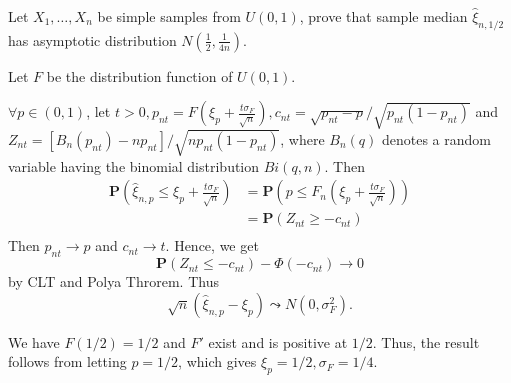 \begin{problem}
    Let $ X_1,\ldots,X_n $ be simple samples from $U(0,1)$, prove that sample median $\hat\xi_{n,1/2}$ has asymptotic distribution $N(\frac12,\frac{1}{4n})$.
\end{problem}
\begin{solution}
    Let $F$ be the distribution function of $U(0,1)$. 

    $\forall p\in (0,1)$, let $t>0, p_{nt} = F(\xi_{p} + \frac{t\sigma_F}{\sqrt{n}}), c_{nt} = \sqrt{p_{nt}-p} / \sqrt{p_{nt}(1-p_{nt})}$ and $Z_{nt} = [B_n(p_{nt})-np_{nt}]/\sqrt{np_{nt}(1-p_{nt})}$, where $B_n(q)$ denotes a random variable having the binomial distribution $Bi(q,n)$. Then
    \begin{equation*}
        \begin{split}
            \mathbf{P} (\hat{\xi}_{n,p} \le \xi_p + \frac{t\sigma_F}{\sqrt{n}}) & = \mathbf{P} (p \le F_n(\xi_p + \frac{t\sigma_F}{\sqrt{n}})) \\
            & = \mathbf{P} (Z_{nt} \ge -c_{nt}) \\
        \end{split}
    \end{equation*}
    Then $p_{nt}\to p$ and $c_{nt}\to t$. Hence, we get
    \begin{equation*}
        \mathbf{P}(Z_{nt}\le -c_{nt}) -\Phi(-c_{nt}) \to 0
    \end{equation*}
    by CLT and Polya Throrem. Thus 
    \begin{equation*}
        \sqrt{n}(\hat{\xi}_{n,p} - \xi_p) \leadsto N(0,\sigma_F^2).
    \end{equation*}

    We have $F(1/2)=1/2$ and $F'$  exist and is positive at $1/2$. Thus, the result follows from letting $p=1/2$, which gives $\xi_p= 1/2, \sigma_F=1/4$.
\end{solution}
